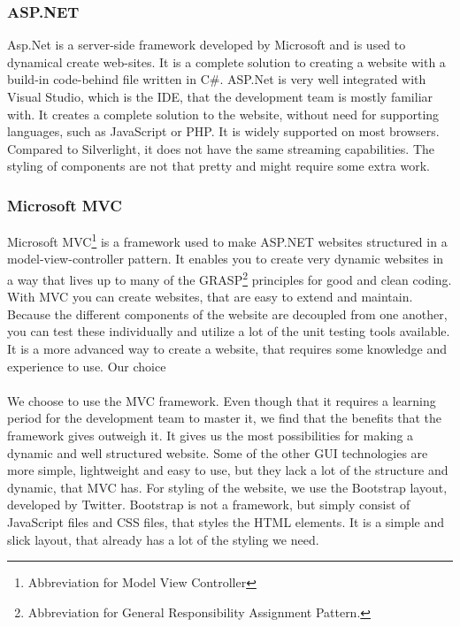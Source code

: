 \documentclass[a4paper,11pt,report]{article}
\begin{document}
{\subsubsection{ASP.NET}
Asp.Net is a server-side framework developed by Microsoft and is used to dynamical create web-sites. It is a complete solution to creating a website with a build-in code-behind file written in C\#. ASP.Net is very well integrated with Visual Studio, which is the IDE, that the development team is mostly familiar with. It creates a complete solution to the website, without need for supporting languages, such as JavaScript or PHP. It is widely supported on most browsers. Compared to Silverlight, it does not have the same streaming capabilities. The styling of components are not that pretty and might require some extra work.

\subsubsection{Microsoft MVC}

Microsoft MVC\footnote{Abbreviation for Model View Controller} is a framework used to make ASP.NET websites structured in a model-view-controller pattern. It enables you to create very dynamic websites in a way that lives up to many of the GRASP\footnote{Abbreviation for General Responsibility Assignment Pattern.} principles for good and clean coding. With MVC you can create websites, that are easy to extend and maintain. Because the different components of the website are decoupled from one another, you can test these individually and utilize a lot of the unit testing tools available. It is a more advanced way to create a website, that requires some knowledge and experience to use.
Our choice
\\ \\
We choose to use the MVC framework. Even though that it requires a learning period for the development team to master it, we find that the benefits that the framework gives outweigh it.  It gives us the most possibilities for making a dynamic and well structured website. Some of the other GUI technologies are more simple, lightweight and easy to use, but they lack a lot of the structure and dynamic, that MVC has. For styling of the website, we use the Bootstrap layout, developed by Twitter. Bootstrap is not a framework, but simply consist of JavaScript files and CSS files, that styles the HTML elements. It is a simple and slick layout, that already has a lot of the styling we need.

}
\end{document}

